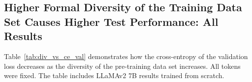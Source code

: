 
\subsection{Higher Formal Diversity of the Training Data Set Causes Higher Test Performance: All Results}
Table~\ref{tab:div_vs_ce_val} demonstrates how the cross-entropy of the validation loss decreases as the diversity of the pre-training data set increases. 
All tokens were fixed. 
The table includes LLaMAv2 7B results trained from scratch.

